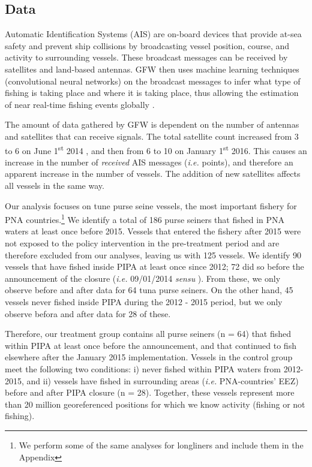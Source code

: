 \documentclass[9p,twocolumn,twoside,lineno]{pnas-new}
\begin{document}
\subsection{Data}\label{data}

Automatic Identification Systems (AIS) are on-board devices that provide
at-sea safety and prevent ship collisions by broadcasting vessel
position, course, and activity to surrounding vessels. These broadcast
messages can be received by satellites and land-based antennas. GFW then uses 
machine learning techniques (convolutional neural networks) on the broadcast messages
to infer what type of fishing is taking place and where it is taking place, thus
allowing the estimation of near real-time fishing events globally \citep{kroodsma_2018}.

The amount of data gathered by GFW is dependent on the number of antennas and
satellites that can receive signals. The total satellite count increased from 3 to 6 on 
June 1\textsuperscript{st}
2014 , and then from 6 to 10 on January
1\textsuperscript{st} 2016. This causes an increase in the number of
\emph{received} AIS messages (\emph{i.e.} points), and therefore an
apparent increase in the number of vessels.
The addition of new satellites affects all vessels in the same way. 

Our analysis focuses on tune purse seine vessels, the most important fishery
for PNA
countries.\footnote{We perform some of the same analyses for longliners and include them in the Appendix}
We identify a total of 186 purse seiners that fished in PNA waters at
least once before 2015. Vessels that entered the fishery after 2015 were not
exposed to the policy intervention in the pre-treatment period and are
therefore excluded from our analyses, leaving us with 125 vessels.
We identify 90 vessels that have fished inside PIPA
at least once since 2012; 72 did so before the announcement
of the closure (\emph{i.e.} 09/01/2014 \emph{sensu} \citep{mcdermott_2018}).
From these, we only observe before and after data for 64 tuna purse seiners.
On the other hand, 45 vessels never fished inside PIPA during the 2012 - 2015 period, 
but we only observe befora and after data for 28 of these.

Therefore, our treatment group contains all purse seiners (n = 64) that
fished within PIPA at least once before the announcement, and that
continued to fish elsewhere after the January 2015 implementation.
Vessels in the control group meet the following two conditions: i)
never fished within PIPA waters from 2012-2015, and ii) vessels have fished in
surrounding areas (\emph{i.e.} PNA-countries' EEZ) before and after PIPA
closure (n = 28). Together, these vessels represent more than 20 million georeferenced positions
for which we know activity (fishing or not fishing).
\end{document}

